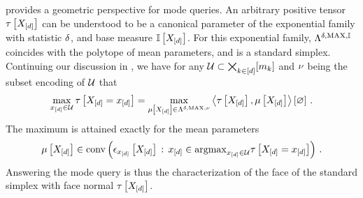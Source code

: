  provides a geometric perspective for mode queries.
An arbitrary positive tensor $\tau\left[X_{[d]}\right]$ can be understood to be a canonical parameter of the exponential family with statistic $\delta$, and base measure $\mathbb{I}\left[X_{[d]}\right]$.
For this exponential family, $\Lambda^{\delta,\mathrm{MAX},\mathbb{I}}$ coincides with the polytope of mean parameters, and is a standard simplex.
Continuing our discussion in , we have for any $\mathcal{U}\subset\bigtimes_{k\in[d]}[m_{k}]$ and $\nu$ being the subset encoding of $\mathcal{U}$ that
\begin{align*}
    \max_{x_{[d]}\in\mathcal{U}} \tau\left[X_{[d]}=x_{[d]}\right] =
    \max_{\mu\left[X_{[d]}\right]\in\Lambda^{\delta,\mathrm{MAX},\nu}} \left\langle \tau\left[X_{[d]}\right],\mu\left[X_{[d]}\right]\right\rangle \left[ \varnothing \right] \, .
\end{align*}
The maximum is attained exactly for the mean parameters
\begin{align*}
    \mu\left[X_{[d]}\right]\in
    \mathrm{conv}\left(\epsilon_{x_{[d]}}\left[X_{[d]}\right] \,:\, x_{[d]}\in\mathrm{argmax}_{x_{[d]}\in\mathcal{U}} \tau\left[X_{[d]}=x_{[d]}\right]\right) \, .
\end{align*}
Answering the mode query is thus the characterization of the face of the standard simplex with face normal $\tau\left[X_{[d]}\right]$.

